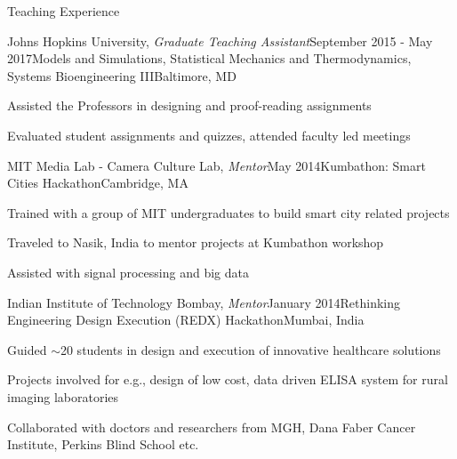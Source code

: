 \documentclass{resume}
\begin{document}
\vspace{1em}

\begin{rSection}{Teaching Experience}

\begin{rSubsection}{Johns Hopkins University, \textit{Graduate Teaching Assistant}}{September 2015 - May 2017}{Models and Simulations, Statistical Mechanics and Thermodynamics, Systems Bioengineering III}{Baltimore, MD}
\item Assisted the Professors in designing and proof-reading assignments
\item Evaluated student assignments and quizzes, attended faculty led meetings
    \end{rSubsection}

\begin{rSubsection}{MIT Media Lab - Camera Culture Lab, \textit{Mentor}}{May 2014}{Kumbathon: Smart Cities Hackathon}{Cambridge, MA}
\item  Trained with a group of MIT undergraduates to build smart city related projects 
\item Traveled to Nasik, India to mentor projects at Kumbathon workshop
\item Assisted with signal processing and big data
    \end{rSubsection}

\begin{rSubsection}{Indian Institute of Technology Bombay, \textit{Mentor}}{January 2014}{Rethinking Engineering Design Execution (REDX) Hackathon}{Mumbai, India}
\item Guided $\sim$20 students in design and execution of innovative healthcare solutions
\item Projects involved for e.g., design of low cost, data driven ELISA system for rural imaging laboratories
\item Collaborated with doctors and researchers from MGH, Dana Faber Cancer Institute, Perkins Blind School etc.
    \end{rSubsection}

  \end{rSection}

\vspace{1em}
\end{document}
